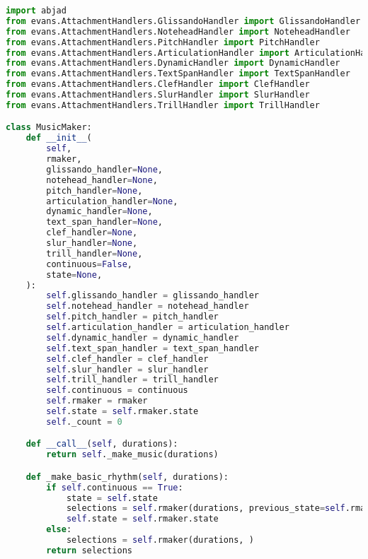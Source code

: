 \singlespace
\begin{lstlisting}[language=Python, caption=MusicMaker source]
import abjad
from evans.AttachmentHandlers.GlissandoHandler import GlissandoHandler
from evans.AttachmentHandlers.NoteheadHandler import NoteheadHandler
from evans.AttachmentHandlers.PitchHandler import PitchHandler
from evans.AttachmentHandlers.ArticulationHandler import ArticulationHandler
from evans.AttachmentHandlers.DynamicHandler import DynamicHandler
from evans.AttachmentHandlers.TextSpanHandler import TextSpanHandler
from evans.AttachmentHandlers.ClefHandler import ClefHandler
from evans.AttachmentHandlers.SlurHandler import SlurHandler
from evans.AttachmentHandlers.TrillHandler import TrillHandler

class MusicMaker:
    def __init__(
        self,
        rmaker,
        glissando_handler=None,
        notehead_handler=None,
        pitch_handler=None,
        articulation_handler=None,
        dynamic_handler=None,
        text_span_handler=None,
        clef_handler=None,
        slur_handler=None,
        trill_handler=None,
        continuous=False,
        state=None,
    ):
        self.glissando_handler = glissando_handler
        self.notehead_handler = notehead_handler
        self.pitch_handler = pitch_handler
        self.articulation_handler = articulation_handler
        self.dynamic_handler = dynamic_handler
        self.text_span_handler = text_span_handler
        self.clef_handler = clef_handler
        self.slur_handler = slur_handler
        self.trill_handler = trill_handler
        self.continuous = continuous
        self.rmaker = rmaker
        self.state = self.rmaker.state
        self._count = 0

    def __call__(self, durations):
        return self._make_music(durations)

    def _make_basic_rhythm(self, durations):
        if self.continuous == True:
            state = self.state
            selections = self.rmaker(durations, previous_state=self.rmaker.state)
            self.state = self.rmaker.state
        else:
            selections = self.rmaker(durations, )
        return selections


\end{lstlisting}
